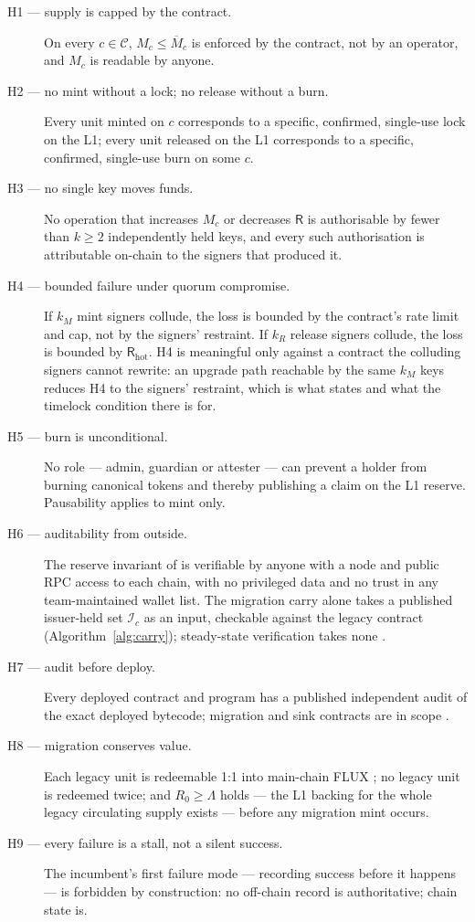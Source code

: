 \begin{description}
\item[H1 --- supply is capped by the contract.] On every $c \in \mathcal{C}$, $M_c \le \overline{M}_c$ is
  enforced by the contract, not by an operator, and $M_c$ is readable by anyone.
\item[H2 --- no mint without a lock; no release without a burn.] Every unit minted on $c$
  corresponds to a specific, confirmed, single-use lock on the L1; every unit released on the L1
  corresponds to a specific, confirmed, single-use burn on some $c$.
\item[H3 --- no single key moves funds.] No operation that increases $M_c$ or decreases $\mathsf{R}$
  is authorisable by fewer than $k \ge 2$ independently held keys, and every such authorisation is
  attributable on-chain to the signers that produced it.
\item[H4 --- bounded failure under quorum compromise.] If $k_M$ mint signers collude, the loss is
  bounded by the contract's rate limit and cap, not by the signers' restraint. If $k_R$ release
  signers collude, the loss is bounded by $\mathsf{R}_{\mathrm{hot}}$. H4 is meaningful only against
  a contract the colluding signers cannot rewrite: an upgrade path reachable by the same $k_M$ keys
  reduces H4 to the signers' restraint, which is what  states and what the
  timelock condition there is for.
\item[H5 --- burn is unconditional.] No role --- admin, guardian or attester --- can prevent a holder
  from burning canonical tokens and thereby publishing a claim on the L1 reserve. Pausability applies
  to mint only.
\item[H6 --- auditability from outside.] The reserve invariant of  is
  verifiable by anyone with a \Flux node and public RPC access to each chain, with no privileged data
  and no trust in any team-maintained wallet list. The migration carry alone takes a published
  issuer-held set $\mathcal{I}_c$ as an input, checkable against the legacy contract
  (Algorithm~\ref{alg:carry}); steady-state verification takes none
  .
\item[H7 --- audit before deploy.] Every deployed contract and program has a published independent
  audit of the exact deployed bytecode; migration and sink contracts are in scope
  .
\item[H8 --- migration conserves value.] Each legacy unit is redeemable 1:1 into main-chain FLUX
  ; no legacy unit is redeemed twice; and $R_0 \ge \Lambda$
  holds --- the L1 backing for the whole legacy circulating supply exists --- before any migration
  mint occurs.
\item[H9 --- every failure is a stall, not a silent success.] The incumbent's first failure mode ---
  recording success before it happens --- is forbidden by construction: no off-chain record is
  authoritative; chain state is.
\end{description}

